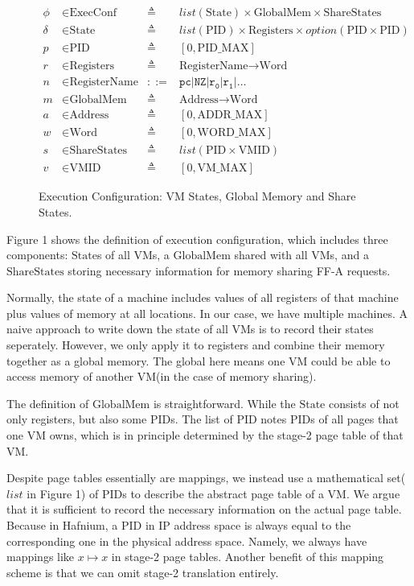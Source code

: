 \documentclass[a4paper]{article}
\newcommand*{\defined}{\triangleq}
\newcommand*{\maps}{\rightarrow}
\newcommand*{\derived}{::=}
\newcommand*{\CONF}{\text{ExecConf}}
\newcommand*{\STATE}{\text{State}}
\newcommand*{\MEM}{\text{GlobalMem}}
\newcommand*{\SSS}{\text{ShareStates}}
\newcommand*{\PID}{\text{PID}}
\newcommand*{\REGS}{\text{Registers}}
\newcommand*{\ADDR}{\text{Address}}
\newcommand*{\WORD}{\text{Word}}
\newcommand*{\VMID}{\text{VMID}}
\newcommand*{\REGNAMES}{\text{RegisterName}}
\newcommand*{\PAMAX}{\text{ADDR\_MAX}}
\newcommand*{\PPIDMAX}{\text{PID\_MAX}}
\newcommand*{\PWMAX}{\text{WORD\_MAX}}
\newcommand*{\PVMMAX}{\text{VM\_MAX}}
\begin{document}
\begin{figure}
  \begin{align*}
    \phi &\in \CONF &\defined &list(\STATE) \times \MEM \times \SSS \\
    \delta &\in \STATE &\defined &list(\PID) \times \REGS \times option(\PID \times \PID) \\
    p & \in \PID &\defined  &[ 0, \PPIDMAX ] \\
    r & \in \REGS &\defined  &\REGNAMES \maps \WORD \\
    n & \in \REGNAMES &\derived  &\mathtt{pc} | \mathtt{NZ} | \mathtt {r_{0}} | \mathtt{r_{1}} | \dots \\
    m & \in \MEM &\defined  &\ADDR \maps \WORD \\
    a & \in \ADDR &\defined  &[ 0, \PAMAX ] \\
    w & \in \WORD &\defined  &[ 0, \PWMAX ] \\
    s & \in \SSS &\defined  &list(\PID \times \VMID) \\
    v & \in \VMID &\defined  &[ 0, \PVMMAX ]
  \end{align*}
  \caption{Execution Configuration: VM States, Global Memory and Share States.}
\end{figure}
Figure 1 shows the definition of execution configuration, which includes three
components: $\STATE$s of all VMs, a $\MEM$ shared with all VMs, and a $\SSS$
storing necessary information for memory sharing FF-A requests.

Normally, the state of a machine includes values of all
registers of that machine plus values of memory at all locations. In our case,
we have multiple machines. A naive approach to write down the state of all VMs
is to record their states seperately. However, we only apply it to registers and
combine their memory together as a global memory. The global here means one VM
could be able to access memory of another VM(in the case of memory sharing).

The definition of $\MEM$ is straightforward. While the $\STATE$ consists of not
only registers, but also some $\PID$s. The list of $\PID$ notes $\PID$s of all
pages that one VM owns, which is in principle determined by the stage-2 page
table of that VM.

Despite page tables essentially are mappings, we instead use a mathematical
set($list$ in Figure 1) of $\PID$s to describe the abstract page table of a VM. We
argue that it is sufficient to record the necessary information on the actual page
table. Because in Hafnium, a $\PID$ in IP address space is always equal to the
corresponding one in the physical address space. Namely, we always have mappings
like $x \mapsto x$ in stage-2 page tables. Another benefit of this mapping scheme is
that we can omit stage-2 translation entirely.
\end{document}
